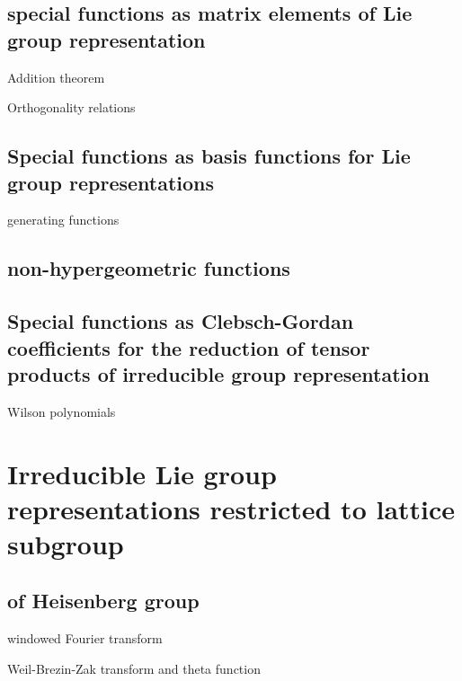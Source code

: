 \documentclass[oneside,12pt]{memoir}
\begin{document}
\subsection{special functions as matrix elements of Lie group representation}

\begin{itemize*}
\item Addition theorem
\item Orthogonality relations
\end{itemize*}

\subsection{Special functions as basis functions for Lie group representations}

\begin{itemize*}
\item generating functions
\end{itemize*}

\subsection{non-hypergeometric functions}


\subsection{Special functions as Clebsch-Gordan coefficients for the reduction of tensor products of irreducible group representation}

\begin{itemize*}
\item Wilson polynomials
\end{itemize*}

\section{Irreducible Lie group representations restricted to lattice subgroup}

\subsection{\IR{} of Heisenberg group}
\begin{itemize*}
\item windowed Fourier transform
\item Weil-Brezin-Zak transform and theta function
\end{itemize*}
\end{document}
